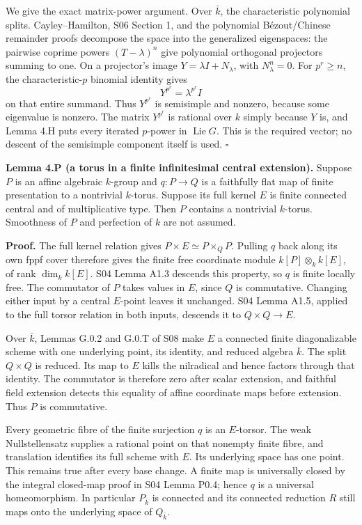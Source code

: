 \documentclass[11pt,a4paper,openany]{report}
\newcounter{none}
\begin{document}
We give the exact matrix-power argument. Over \(\bar k\), the characteristic polynomial splits. Cayley--Hamilton, S06 Section 1, and the polynomial Bézout/Chinese remainder proofs decompose the space into the generalized eigenspaces: the pairwise coprime powers \((T-\lambda)^n\) give polynomial orthogonal projectors summing to one. On a projector's image \(Y=\lambda I+N_\lambda\), with \(N_\lambda^n=0\). For \(p^r\ge n\), the characteristic-\(p\) binomial identity gives \[
 Y^{p^r}=\lambda^{p^r}I
\] on that entire summand. Thus \(Y^{p^r}\) is semisimple and nonzero, because some eigenvalue is nonzero. The matrix \(Y^{p^r}\) is rational over \(k\) simply because \(Y\) is, and Lemma 4.H puts every iterated \(p\)-power in \(\operatorname{Lie}G\). This is the required vector; no descent of the semisimple component itself is used. \(\square\)

\textbf{Lemma 4.P (a torus in a finite infinitesimal central extension).} Suppose \(P\) is an affine algebraic \(k\)-group and \(q:P\to Q\) is a faithfully flat map of finite presentation to a nontrivial \(k\)-torus. Suppose its full kernel \(E\) is finite connected central and of multiplicative type. Then \(P\) contains a nontrivial \(k\)-torus. Smoothness of \(P\) and perfection of \(k\) are not assumed.

\textbf{Proof.} The full kernel relation gives \(P\times E\simeq P\times_QP\). Pulling \(q\) back along its own fppf cover therefore gives the finite free coordinate module \(k[P]\otimes_k k[E]\), of rank \(\dim_k k[E]\). S04 Lemma A1.3 descends this property, so \(q\) is finite locally free. The commutator of \(P\) takes values in \(E\), since \(Q\) is commutative. Changing either input by a central \(E\)-point leaves it unchanged. S04 Lemma A1.5, applied to the full torsor relation in both inputs, descends it to \(Q\times Q\to E\).

Over \(\bar k\), Lemmas G.0.2 and G.0.T of S08 make \(E\) a connected finite diagonalizable scheme with one underlying point, its identity, and reduced algebra \(\bar k\). The split \(Q\times Q\) is reduced. Its map to \(E\) kills the nilradical and hence factors through that identity. The commutator is therefore zero after scalar extension, and faithful field extension detects this equality of affine coordinate maps before extension. Thus \(P\) is commutative.

Every geometric fibre of the finite surjection \(q\) is an \(E\)-torsor. The weak Nullstellensatz supplies a rational point on that nonempty finite fibre, and translation identifies its full scheme with \(E\). Its underlying space has one point. This remains true after every base change. A finite map is universally closed by the integral closed-map proof in S04 Lemma P0.4; hence \(q\) is a universal homeomorphism. In particular \(P_{\bar k}\) is connected and its connected reduction \(R\) still maps onto the underlying space of \(Q_{\bar k}\).
\end{document}
